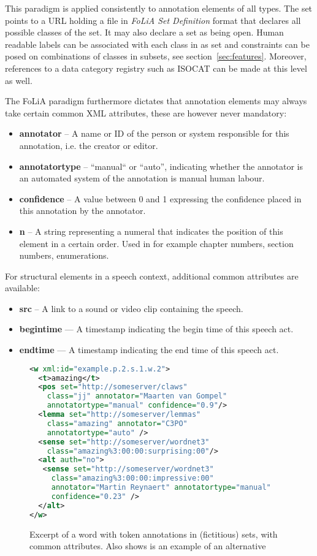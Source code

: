 \documentclass[a4paper,10pt,twoside]{article}
\begin{document}
This paradigm is applied consistently to annotation elements of all types. The
set points to a URL holding a file in \emph{FoLiA Set Definition} format that
declares all possible classes of the set. It may also declare a set as being
open. Human readable labels can be associated with each class in as set and
constraints can be posed on combinations of classes in subsets, see
section~\ref{sec:features}. Moreover, references to a data category registry
such as ISOCAT \cite{ISOCAT} can be made at this level as well.

The FoLiA paradigm furthermore dictates that annotation elements may always take certain
common XML attributes, these are however never mandatory:

\begin{itemize}
\item \textbf{annotator} -- A name or ID of the person or system responsible for this annotation, i.e. the creator or editor.
\item \textbf{annotatortype} -- ``manual`` or ``auto'', indicating whether the annotator is an automated system of the annotation is manual human labour.
\item \textbf{confidence} -- A value between 0 and 1 expressing the confidence placed in this annotation by the annotator.
\item \textbf{n} -- A string representing a numeral that indicates the position of this element in a certain order. Used in for example chapter numbers, section numbers, enumerations.
\end{itemize}

For structural elements in a speech context, additional common attributes are
available:

\begin{itemize}
  \item \textbf{src} -- A link to a sound or video clip containing the speech.
  \item \textbf{begintime} --- A timestamp indicating the begin time of this speech act.
  \item \textbf{endtime} --- A timestamp indicating the end time of this speech act.
\end{itemize}

\begin{figure}[tbh]

\label{fig:wordannotation}
\begin{lstlisting}[language=xml]
<w xml:id="example.p.2.s.1.w.2">
  <t>amazing</t>
  <pos set="http://someserver/claws" 
    class="jj" annotator="Maarten van Gompel"
    annotatortype="manual" confidence="0.9"/>
  <lemma set="http://someserver/lemmas"
    class="amazing" annotator="C3PO" 
    annotatortype="auto" />
  <sense set="http://someserver/wordnet3"
    class="amazing%3:00:00:surprising:00"/>
  <alt auth="no">
   <sense set="http://someserver/wordnet3"
     class="amazing%3:00:00:impressive:00"
     annotator="Martin Reynaert" annotatortype="manual"
     confidence="0.23" />
  </alt>
</w> 
\end{lstlisting}
\caption{Excerpt of a word with token annotations in (fictitious) sets, with common attributes. Also shows is an example of an alternative} 
\end{figure}
\end{document}
